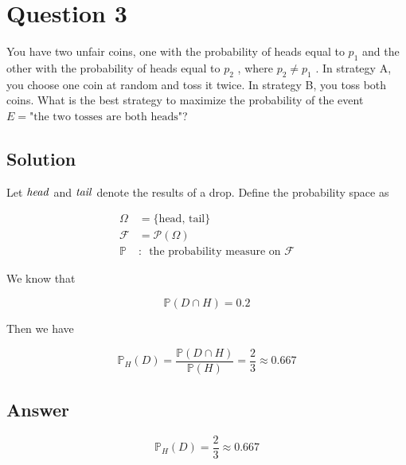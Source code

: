 \documentclass[12pt]{article}
\newcommand{\bP}{\mathbb{P}}
\begin{document}
	
	\section*{Question 3}
	
	\noindent You have two unfair coins, one with the probability of heads equal to $p_1$ and the other with the probability of heads equal to $p_2$ , where $p_2 \neq p_1$ . In strategy A, you choose one coin at random and toss it twice. In strategy B, you toss both coins. What is the best strategy to maximize the probability of the event $E = \text{"the two tosses are both heads"}$?
	
	\subsection*{Solution}
		
		Let $\it{head}$ and $\it{tail}$ denote the results of a drop. Define the probability space as
	
		\[
		\begin{aligned}
			\Omega &= \{\mathrm{head},\,\mathrm{tail}\}\\
			\mathcal{F} &= \mathcal{P}(\Omega)\\
			\bP &:\enspace \text{the probability measure on $\mathcal{F}$}
		\end{aligned}
		\]
		
		We know that
		
		\[\bP(D\cap H) = 0.2\]
		
		Then we have
		
		\[\bP_H(D) = \frac{\bP(D\cap H)}{\bP(H)} = \frac{2}{3} \approx 0.667\]
	
	\subsection*{Answer}
	
		\[\boxed{\bP_H(D) = \frac{2}{3} \approx 0.667}\]
\end{document}
